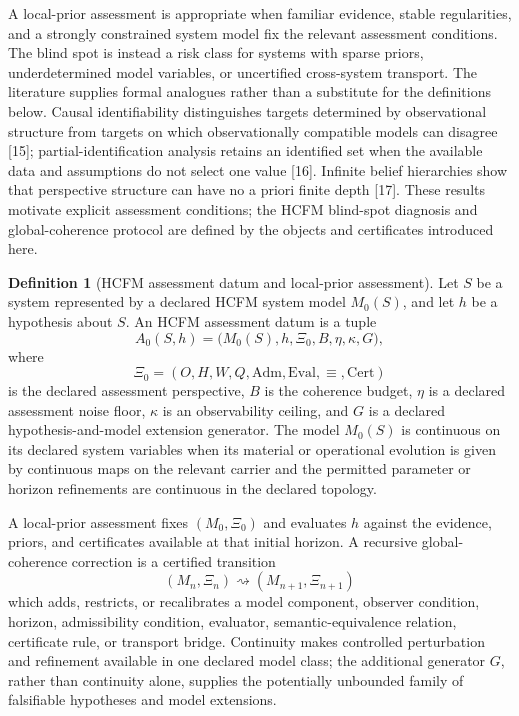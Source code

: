 \documentclass[11pt]{article}
\theoremstyle{definition}
\newtheorem{definition}{Definition}
\begin{document}
A local-prior assessment is appropriate when familiar evidence, stable regularities, and a strongly constrained system model fix the relevant assessment conditions. The blind spot is instead a risk class for systems with sparse priors, underdetermined model variables, or uncertified cross-system transport. The literature supplies formal analogues rather than a substitute for the definitions below. Causal identifiability distinguishes targets determined by observational structure from targets on which observationally compatible models can disagree [15]; partial-identification analysis retains an identified set when the available data and assumptions do not select one value [16]. Infinite belief hierarchies show that perspective structure can have no a priori finite depth [17]. These results motivate explicit assessment conditions; the HCFM blind-spot diagnosis and global-coherence protocol are defined by the objects and certificates introduced here.

\begin{definition}[HCFM assessment datum and local-prior assessment]
Let $S$ be a system represented by a declared HCFM system model $M_0(S)$, and let $h$ be a hypothesis about $S$. An HCFM assessment datum is a tuple
\begin{equation}
A_0(S, h) = \big(M_0(S), h, \Xi_0, B, \eta, \kappa, G\big), \tag{S32a}
\end{equation}
where
\[
\Xi_0 = (O, H, W, Q, \mathrm{Adm}, \mathrm{Eval}, \equiv, \mathrm{Cert})
\]
is the declared assessment perspective, $B$ is the coherence budget, $\eta$ is a declared assessment noise floor, $\kappa$ is an observability ceiling, and $G$ is a declared hypothesis-and-model extension generator. The model $M_0(S)$ is continuous on its declared system variables when its material or operational evolution is given by continuous maps on the relevant carrier and the permitted parameter or horizon refinements are continuous in the declared topology.

A local-prior assessment fixes $(M_0, \Xi_0)$ and evaluates $h$ against the evidence, priors, and certificates available at that initial horizon. A recursive global-coherence correction is a certified transition
\begin{equation}
(M_n, \Xi_n) \rightsquigarrow (M_{n+1}, \Xi_{n+1}) \tag{S32b}
\end{equation}
which adds, restricts, or recalibrates a model component, observer condition, horizon, admissibility condition, evaluator, semantic-equivalence relation, certificate rule, or transport bridge. Continuity makes controlled perturbation and refinement available in one declared model class; the additional generator $G$, rather than continuity alone, supplies the potentially unbounded family of falsifiable hypotheses and model extensions.
\end{definition}
\end{document}
